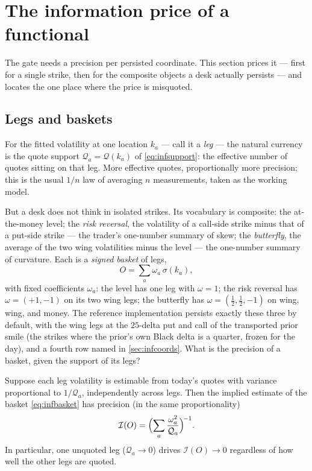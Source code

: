 \section{The information price of a functional}
\label{sec:infprice}

The gate needs a precision per persisted coordinate.  This section
prices it --- first for a single strike, then for the composite
objects a desk actually persists --- and locates the one place
where the price is misquoted.

\subsection{Legs and baskets}

For the fitted volatility at one location $k_a$ --- call it a
\emph{leg} --- the natural currency is the quote support
$\mathcal{Q}_a=\mathcal{Q}(k_a)$ of \cref{eq:infsupport}: the
effective number of quotes sitting on that leg.  More effective
quotes, proportionally more precision; this is the usual
$1/n$ law of averaging $n$ measurements, taken as the working model.

But a desk does not think in isolated strikes.  Its vocabulary is
composite: the at-the-money level; the \emph{risk reversal}, the
volatility of a call-side strike minus that of a put-side strike ---
the trader's one-number summary of skew; the \emph{butterfly}, the
average of the two wing volatilities minus the level --- the
one-number summary of curvature.  Each is a \emph{signed basket} of
legs,
\begin{equation}
O=\sum_a \omega_a\,\sigma(k_a),
\label{eq:infbasket}
\end{equation}
with fixed coefficients $\omega_a$: the level has one leg with
$\omega=1$; the risk reversal has $\omega=(+1,-1)$ on its two wing
legs; the butterfly has
$\omega=(\tfrac12,\tfrac12,-1)$ on wing, wing, and money.  The
reference implementation persists exactly these three by default,
with the wing legs at the $25$-delta put and call of the transported
prior smile (the strikes where the prior's own Black delta is a
quarter, frozen for the day), and a fourth row named in
\cref{sec:infcoords}.  What is
the precision of a basket, given the support of its legs?

\begin{proposition}
\label{prop:infharmonic}
Suppose each leg volatility is estimable from today's quotes with
variance proportional to $1/\mathcal{Q}_a$, independently across
legs.  Then the implied estimate of the basket \cref{eq:infbasket}
has precision (in the same proportionality)
\begin{equation}
\mathcal{I}(O)
=\Bigl(\sum_a\frac{\omega_a^2}{\mathcal{Q}_a}\Bigr)^{\!-1}.
\label{eq:infharmonic}
\end{equation}
In particular, one unquoted leg ($\mathcal{Q}_a\to0$) drives
$\mathcal{I}(O)\to0$ regardless of how well the other legs are
quoted.
\end{proposition}

